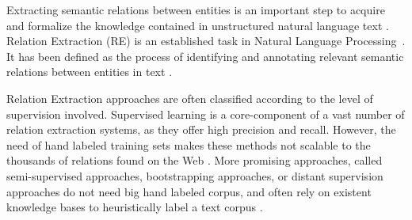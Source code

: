 
Extracting semantic relations between entities is an important step to acquire and formalize the knowledge contained in unstructured natural language text \citep{Wang2008}. 
Relation Extraction (RE) is an established task in Natural Language Processing~\citep{Bach2007}. It has been defined as the process of identifying and annotating relevant semantic relations between entities in text \citep{JiangZhai2007}. 

Relation Extraction approaches are often classified according to the level of supervision involved.
Supervised learning is a core-component of a vast number of relation extraction systems, as they offer high precision and recall. However, the need of hand labeled training sets makes these methods not scalable to the thousands of relations found on the Web \citep{Hoffmann2011}.
More promising approaches, called semi-supervised approaches, bootstrapping approaches, or distant supervision approaches do not need big hand labeled corpus, and
often rely on existent knowledge bases to heuristically label a text corpus \citep{Carlson2010,Hoffmann2011}.

